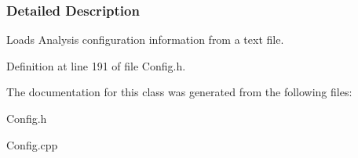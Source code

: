\subsubsection{Detailed Description}
Loads Analysis configuration information from a text file. 

Definition at line 191 of file Config.h.



The documentation for this class was generated from the following files:\begin{DoxyCompactItemize}
\item 
Config.h\item 
Config.cpp\end{DoxyCompactItemize}
